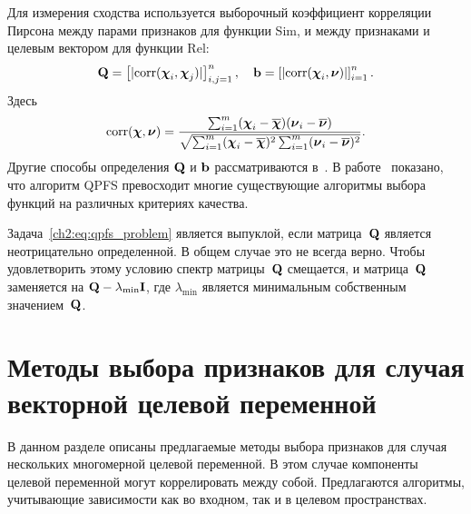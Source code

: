 Для измерения сходства используется выборочный коэффициент корреляции Пирсона между парами признаков для функции Sim, и между признаками и целевым вектором для функции Rel:
\begin{equation}
\mathbf{Q} = \left[|\text{corr}(\boldsymbol{\chi}_i, \boldsymbol{\chi}_j)|\right]_{i,j=1}^n, \quad \mathbf{b} = \left[|\text{corr}(\boldsymbol{\chi}_i, \boldsymbol{\nu})|\right]_{i=1}^n.
\label{ch2:eq:qpfs_1d_qb}
\end{equation}
Здесь
\begin{equation*}
\text{corr}(\boldsymbol{\chi}, \boldsymbol{\nu}) = \frac{\sum_{i=1}^m(\boldsymbol{\chi}_i - \overline{\boldsymbol{\chi}})( \boldsymbol{\nu}_i - \overline{\boldsymbol{\nu}})}{\sqrt{\sum_{i=1}^m(\boldsymbol{\chi}_i - \overline{\boldsymbol{\chi}})^2\sum_{i=1}^m(\boldsymbol{\nu}_i - \overline{\boldsymbol{\nu}})^2}}.
\end{equation*}
Другие способы определения $\mathbf{Q}$ и $\mathbf{b}$ рассматриваются в~\cite{katrutsa2017comprehensive}. 
В работе~\cite{katrutsa2017comprehensive} показано, что алгоритм QPFS превосходит многие существующие алгоритмы выбора функций на различных критериях качества.

Задача~\eqref{ch2:eq:qpfs_problem} является выпуклой, если матрица~$\mathbf{Q}$ является неотрицательно определенной. В общем случае это не всегда верно. 
Чтобы удовлетворить этому условию спектр матрицы~$\mathbf{Q}$ смещается, и матрица~$\mathbf{Q}$ заменяется на $\mathbf{Q} - \lambda_{\text{min}} \mathbf{I}$, где $\lambda_{\text{min}} $ является минимальным собственным значением~$\mathbf{Q}$.

\section{Методы выбора признаков для случая векторной целевой переменной}
\label{sec:ch3:mqpfs_feature_selection}

В данном разделе описаны предлагаемые методы выбора признаков для случая нескольких многомерной целевой переменной.
В этом случае компоненты целевой переменной могут коррелировать между собой. 
Предлагаются алгоритмы, учитывающие зависимости как во входном, так и в целевом пространствах.

